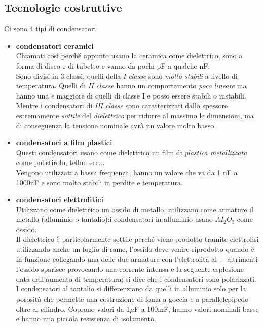 \documentclass{article}
\begin{document}
\subsection{Tecnologie costruttive}
Ci sono 4 tipi di condensatori:
\begin{itemize}
    \item \textbf{condensatori ceramici}\\
    Chiamati così perché appunto usano la  ceramica come dielettrico, sono a forma di disco e di tubetto e vanno da pochi pF a qualche nF.\\
    Sono divisi in 3 classi, quelli della \textit{I classe} sono \textit{molto stabili} a livello di temperatura. 
    Quelli di \textit{II classe} hanno un comportamento \textit{poco lineare} ma hanno una $\epsilon$ maggiore di quelli di classe I e posso essere stabili o instabili.
    Mentre i condensatori di \textit{III classe} sono caratterizzati dallo spessore estremamente \textit{sottile} del \textit{dielettrico} per ridurre al massimo le dimensioni, ma di conseguenza la tensione nominale avrà un valore molto basso.
    
    \item \textbf{condensatori a film plastici}\\
   Questi condensatori usano come dielettrico un film di \textit{plastica metallizzata} come polistirolo, teflon ecc...\\
   Vengono utilizzati a bassa frequenza, hanno un valore che va da 1 nF a  1000nF e sono molto stabili in perdite e temperatura.
    
    \item \textbf{condensatori elettrolitici}\\
    Utilizzano come dielettrico un ossido di metallo, utilizzano come armature il metallo (alluminio o tantalio);i condensatori in alluminio usano $AI_2O_3$ come ossido.\\
    Il dielettrico è particolarmente sottile perché viene prodotto tramite elettrolisi utilizzando anche un foglio di rame, l'ossido deve venire riprodotto quando è in funzione collegando una delle due armature con l'elettrolita al + altrimenti l'ossido sparisce provocando una corrente intensa e la seguente esplosione data dall'aumento di temperatura; si dice che i condensatori sono polarizzati.\\
    I condensatori al tantalio si differenziano da quelli in alluminio solo per la porosità che permette una costruzione di foma a goccia e a parallelepipedo oltre al cilindro. Coprono valori da 1$\mu$F a 100mF, hanno valori nominali basse e hanno una piccola resistenza di isolamento.
    

\end{itemize}
\end{document}
